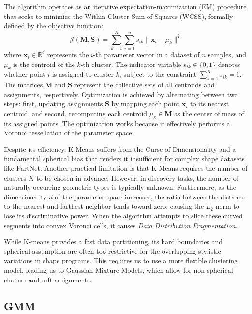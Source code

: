 \documentclass{thesis}
\begin{document}
The algorithm operates as an iterative expectation-maximization (EM) procedure that seeks to minimize the Within-Cluster Sum of Squares (WCSS), formally defined by the objective function:
\begin{equation}
    \mathcal{J}(\mathbf{M}, \mathbf{S}) = \sum_{k=1}^{K} \sum_{i=1}^{n} s_{ik} \| \mathbf{x}_i - \mu_k \|^2
\end{equation}
where $\mathbf{x}_i \in \mathbb{R}^d$ represents the $i$-th parameter vector in a dataset of $n$ samples, and $\mu_k$ is the centroid of the $k$-th cluster. The indicator variable $s_{ik} \in \{0, 1\}$ denotes whether point $i$ is assigned to cluster $k$, subject to the constraint $\sum_{k=1}^K s_{ik} = 1$. The matrices $\mathbf{M}$ and $\mathbf{S}$ represent the collective sets of all centroids and assignments, respectively. Optimization is achieved by alternating between two steps: first, updating assignments $\mathbf{S}$ by mapping each point $\mathbf{x}_i$ to its nearest centroid, and second, recomputing each centroid $\mu_k \in \mathbf{M}$ as the center of mass of its assigned points. The optimization works because it effectively performs a Voronoi tessellation of the parameter space.

Despite its efficiency, K-Means suffers from the Curse of Dimensionality and a fundamental spherical bias that renders it insufficient for complex shape datasets like PartNet. Another practical limitation is that K-Means requires the number of clusters $K$ to be chosen in advance. However, in discovery tasks, the number of naturally occurring geometric types is typically unknown. Furthermore, as the dimensionality $d$ of the parameter space increases, the ratio between the distance to the nearest and farthest neighbor tends toward zero, causing the $L_2$ norm to lose its discriminative power. When the algorithm attempts to slice these curved segments into convex Voronoi cells, it causes \textit{Data Distribution Fragmentation}.

While K-means provides a fast data partitioning, its hard boundaries and spherical assumption are often too restrictive for the overlapping stylistic variations in shape programs. This requires us to use a more flexible clustering model, leading us to Gaussian Mixture Models, which allow for non-spherical clusters and soft assignments.

\subsection{GMM}
\end{document}
